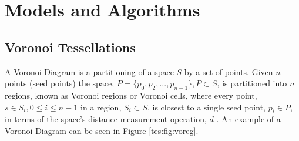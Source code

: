 \section{Models and Algorithms}\label{tes}
\subsection{Voronoi Tessellations}\label{tes:sec:vor}
A Voronoi Diagram is a partitioning of a space $S$ by a set of points. Given $n$ points (seed points) the space, $P = \{p_0,p_2,...,p_{n-1}\}, P \subset S$, is partitioned into $n$ regions, known as Voronoi regions or Voronoi cells, where every point, $s \in S_i,0 \leq i \leq n-1$ in a region, $S_i \subset S$, is closest to a single seed point, $p_i \in P$, in terms of the space's distance measurement operation, $d$ \citep{okabe2009spatial}. An example of a Voronoi Diagram can be seen in Figure \ref{tes:fig:voreg}.
%
